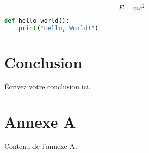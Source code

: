 \documentclass[12pt,a4paper]{report}  %
\begin{document}
\begin{equation}
    E = mc^2
    \label{eq:einstein}
\end{equation}

\begin{lstlisting}[language=Python, caption=Exemple de code Python]
def hello_world():
    print("Hello, World!")
\end{lstlisting}

\chapter{Conclusion}
Écrivez votre conclusion ici.



\appendix
\chapter{Annexe A}
Contenu de l'annexe A.
\end{document}
